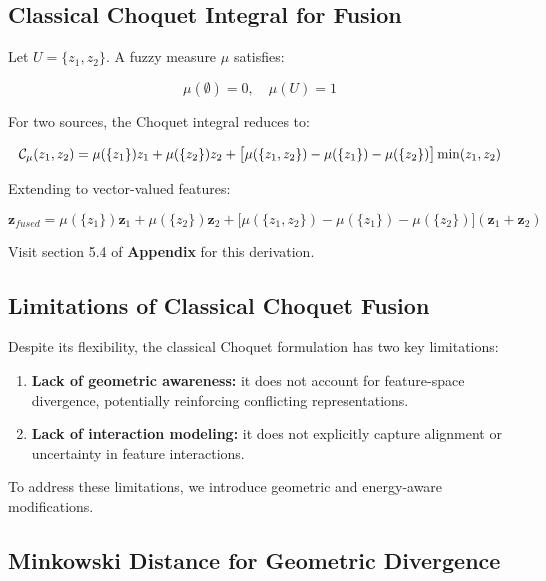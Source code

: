 \documentclass[preprint,12pt]{elsarticle}
\begin{document}
\subsection{Classical Choquet Integral for Fusion}

Let $U = \{z_1, z_2\}$. A fuzzy measure $\mu$ satisfies:

\begin{equation*}
\mu(\emptyset)=0,\quad \mu(U)=1
\end{equation*}

For two sources, the Choquet integral reduces to:

\begin{equation*}
\resizebox{\columnwidth}{!}{$
\mathcal{C}_\mu(z_1,z_2)
=
\mu(\{z_1\})z_1
+
\mu(\{z_2\})z_2
+
\big[\mu(\{z_1,z_2\}) - \mu(\{z_1\}) - \mu(\{z_2\})\big]
\min(z_1,z_2)
$}
\end{equation*}

Extending to vector-valued features:

\begin{equation*}
\mathbf{z}_{fused}
=
\mu(\{z_1\})\mathbf{z}_1
+
\mu(\{z_2\})\mathbf{z}_2
+
\big[\mu(\{z_1,z_2\}) - \mu(\{z_1\}) - \mu(\{z_2\})\big]
(\mathbf{z}_1 + \mathbf{z}_2)
\end{equation*}

Visit section 5.4 of \textbf{Appendix} for this derivation.


\subsection{Limitations of Classical Choquet Fusion}

Despite its flexibility, the classical Choquet formulation has two key limitations:

\begin{enumerate}
    \item \textbf{Lack of geometric awareness:} it does not account for feature-space divergence, potentially reinforcing conflicting representations.
    \item \textbf{Lack of interaction modeling:} it does not explicitly capture alignment or uncertainty in feature interactions.
\end{enumerate}

To address these limitations, we introduce geometric and energy-aware modifications.

\subsection{Minkowski Distance for Geometric Divergence}
\end{document}
